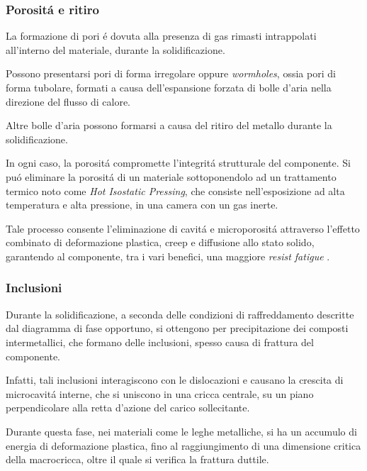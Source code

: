 \documentclass{article}
\begin{document}
            \subsubsection{Porositá e ritiro\label{Casting_difetti_porosita}}

            La formazione di pori é dovuta alla presenza di gas rimasti intrappolati all'interno del materiale, 
            durante la solidificazione.

            Possono presentarsi pori di forma irregolare oppure \textit{wormholes}, ossia pori di forma tubolare, 
            formati a causa dell'espansione forzata di bolle d'aria nella direzione del flusso di calore.
            
            Altre bolle d'aria possono formarsi a causa del ritiro del metallo durante la solidificazione.

            In ogni caso, la porositá compromette l'integritá strutturale del componente. 
            Si puó eliminare la porositá di un materiale sottoponendolo ad un trattamento termico noto come
            \textit{Hot Isostatic Pressing}, che consiste nell'esposizione ad alta temperatura e alta pressione, 
            in una camera con un gas inerte. 

            Tale processo consente l'eliminazione di cavitá e microporositá attraverso l'effetto combinato 
            di deformazione plastica, creep e diffusione allo stato solido, garantendo al componente, tra i vari benefici,
            una maggiore \textit{resist fatigue} \autocite{Mouritz}.


            \subsubsection{Inclusioni\label{Casting_difetti_inclusioni}}

            Durante la solidificazione, a seconda delle condizioni di raffreddamento 
             descritte 
            dal diagramma di fase opportuno, si ottengono per precipitazione dei composti intermetallici, 
            che formano delle inclusioni, spesso causa di frattura del componente.  

            Infatti, tali inclusioni interagiscono con le dislocazioni e causano la crescita di microcavitá interne, 
            che si uniscono in una cricca centrale, su un piano perpendicolare alla retta d'azione
            del carico sollecitante. 

            Durante questa fase, nei materiali come le leghe metalliche, si ha un accumulo di energia di 
            deformazione plastica, fino al raggiungimento di una dimensione critica della macrocricca, oltre il quale
            si verifica la frattura duttile. 
\end{document}
